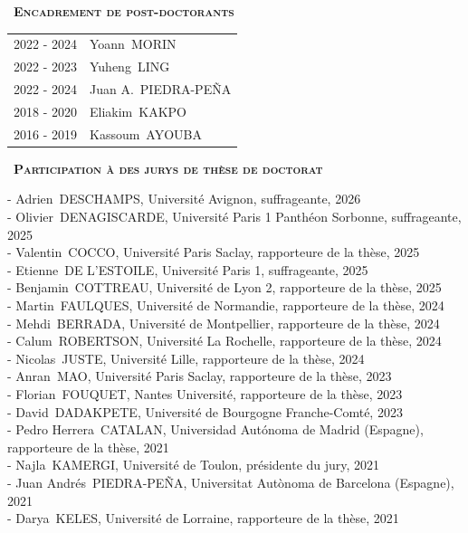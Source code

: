 \documentclass[a4paper,12pt]{article}
\newcommand{\smalltitre}[1]{%
	\noindent \textbullet~\textsc{\textbf{#1}}
	\smallskip
	}
\begin{document}
\smalltitre{Encadrement de post-doctorants}
	
\noindent \begin{longtable}{@{}p{\annee}p{\texte}@{}}
2022 - 2024 & Yoann~MORIN \\
2022 - 2023 & Yuheng~LING \\
2022 - 2024 & Juan A.~PIEDRA-PEÑA \\
2018 - 2020 & Eliakim~KAKPO \\
2016 - 2019 & Kassoum~AYOUBA \\
\end{longtable}


\smalltitre{Participation à des jurys de thèse de doctorat} \medskip
	
\noindent 
- Adrien~DESCHAMPS, Université Avignon, suffrageante, 2026 \\
- Olivier~DENAGISCARDE, Université Paris 1 Panthéon Sorbonne, suffrageante, 2025 \\
- Valentin~COCCO, Université Paris Saclay, rapporteure de la thèse, 2025 \\
- Etienne~DE L'ESTOILE, Université Paris 1, suffrageante, 2025 \\
- Benjamin~COTTREAU, Université de Lyon 2, rapporteure de la thèse, 2025 \\
- Martin~FAULQUES, Université de Normandie, rapporteure de la thèse, 2024 \\
- Mehdi~BERRADA, Université de Montpellier, rapporteure de la thèse, 2024 \\
- Calum~ROBERTSON, Université La Rochelle, rapporteure de la thèse, 2024 \\
- Nicolas~JUSTE, Université Lille, rapporteure de la thèse, 2024 \\
- Anran~MAO, Université Paris Saclay, rapporteure de la thèse, 2023 \\
- Florian~FOUQUET, Nantes Université, rapporteure de la thèse, 2023 \\
- David~DADAKPETE, Université de Bourgogne Franche-Comté, 2023 \\
- Pedro Herrera~CATALAN, Universidad Autónoma de Madrid (Espagne), rapporteure de la thèse, 2021 \\
- Najla~KAMERGI, Université de Toulon, présidente du jury, 2021 \\
- Juan Andrés~PIEDRA-PEÑA, Universitat Autònoma de Barcelona (Espagne), 2021 \\ 
- Darya~KELES, Université de Lorraine, rapporteure de la thèse, 2021 \\ 
\end{document}
